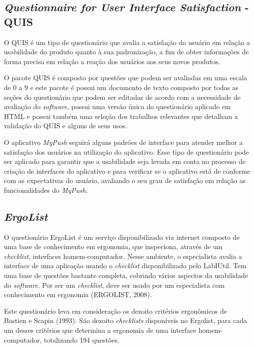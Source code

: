     \subsection{\textit{Questionnaire for User Interface Satisfaction} - QUIS}
      
      \nocite{quis}
      O QUIS é um tipo de questionário que avalia a satisfação do usuário em relação a usabilidade do produto quanto à sua
      padronização, a fim de obter informações de forma precisa em relação a reação dos usuários aos seus novos produtos. 
      
      O pacote QUIS é composto por questões que podem ser avaliadas em uma escala de 0 a 9 e este pacote é possui um documento
      de texto composto por todas as seções do questionário que podem ser editadas de acordo com a necessidade de avaliação do 
      \textit{software}, possui uma versão única do questionário aplicado em HTML e possui também uma seleção dos trabalhos relevantes
      que detalham a validação do QUIS e alguns de seus usos. 
      
      O aplicativo \textit{MyPush} seguirá alguns padrões de interface para atender melhor a satisfação dos usuários na utilização do
      aplicativo. Esse tipo de questionário pode ser aplicado para garantir que a usabilidade seja levada em conta no processo de
      criação de interfaces do aplicativo e para verificar se o aplicativo está de conforme com as expectativas do usuário, 
      avaliando o seu grau de satisfação em relação as funcionalidades do \textit{MyPush}.
      
    \subsection{\textit{ErgoList}}
    
      O questionário ErgoList é um serviço disponibilizado via internet composto de uma base de conhecimento em ergonomia,
      que inspeciona, através de um \textit{checklist}, interfaces homem-computador. Nesse ambiente, o especialista avalia a interface 
      de uma aplicação usando o \textit{checklist} disponibilizado pelo LabIUtil. Tem uma base de questões bastante completa, cobrindo
      vários aspectos da usabilidade do \textit{software}. Por ser um \textit{checklist}, deve ser usado por um especialista com conhecimento em
      ergonomia (ERGOLIST, 2008).
      
      Este questionário leva em consideração os dezoito critérios ergonômicos de Bastien e Scapin (1993). São dezoito \textit{checklists}
      disponíveis no Ergolist, para cada um desses critérios que determina a ergonomia de uma interface homem-computador,
      totalizando 194 questões.
      
